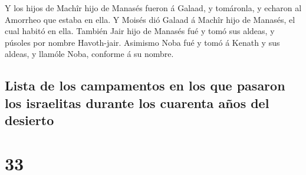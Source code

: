  Y los hijos de Machîr hijo de Manasés fueron á Galaad, y
tomáronla, y echaron al Amorrheo que estaba en ella.  Y
Moisés dió Galaad á Machîr hijo de Manasés, el cual habitó en ella.
 También Jair hijo de Manasés fué y tomó sus aldeas, y
púsoles por nombre Havoth-jair.  Asimismo Noba fué y tomó á
Kenath y sus aldeas, y llamóle Noba, conforme á su nombre.

\hypertarget{lista-de-los-campamentos-en-los-que-pasaron-los-israelitas-durante-los-cuarenta-auxf1os-del-desierto}{%
\subsection{Lista de los campamentos en los que pasaron los israelitas
durante los cuarenta años del
desierto}\label{lista-de-los-campamentos-en-los-que-pasaron-los-israelitas-durante-los-cuarenta-auxf1os-del-desierto}}

\hypertarget{section-32}{%
\section{33}\label{section-32}}

